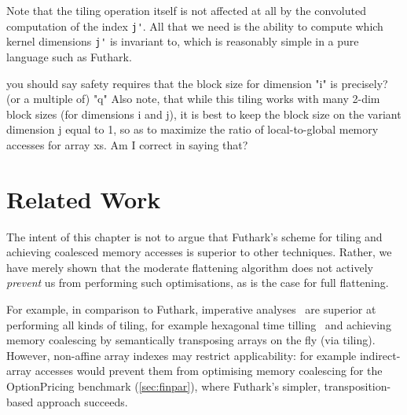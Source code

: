 Note that the tiling operation itself is not affected at all by the
convoluted computation of the index \lstinline{j'}.  All that we need
is the ability to compute which kernel dimensions \lstinline{j'} is
invariant to, which is reasonably simple in a pure language such as
Futhark.

you should say safety requires that the block size for
dimension "i"
is precisely? (or a multiple of) "q"
Also note, that while this tiling works with many 2-dim block sizes
(for dimensions i and j), it is best to keep the block size on the variant
dimension j equal to 1, so as to maximize the ratio of local-to-global
memory accesses for array xs.
Am I correct in saying that?

\section{Related Work}

The intent of this chapter is not to argue that Futhark's scheme for
tiling and achieving coalesced memory accesses is superior to other
techniques.  Rather, we have merely shown that the moderate flattening
algorithm does not actively \textit{prevent} us from performing such
optimisations, as is the case for full flattening.

For example, in comparison to Futhark, imperative
analyses~\cite{InformalTiling,PolyPluto2} are superior at performing
all kinds of tiling, for example hexagonal time
tilling~\cite{HexaTiling} and achieving memory coalescing by
semantically transposing arrays on the fly (via tiling).
%
However, non-affine array indexes may restrict applicability: for
example indirect-array accesses would prevent them from optimising
memory coalescing for the OptionPricing benchmark (\cref{sec:finpar}),
where Futhark's simpler, transposition-based approach succeeds.

